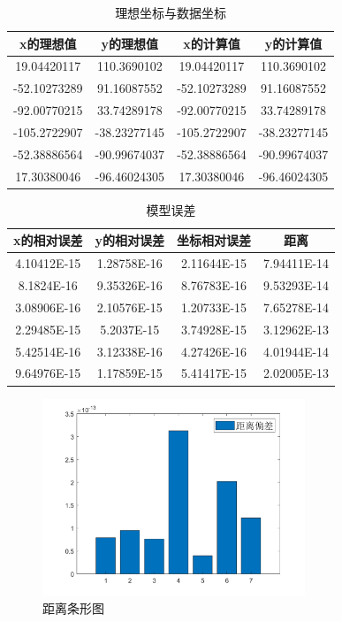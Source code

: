 \documentclass[12pt]{ctexart}
\begin{document}
\begin{spacing}{1.5}
\begin{center}
\begin{table}[H]
	\centering
	\begin{tabular}{cccc}
		\toprule[1.5pt]
		x的理想值        & y的理想值        & x的计算值        & y的计算值        \\ 
		\midrule[1pt]
		19.04420117  & 110.3690102  & 19.04420117  & 110.3690102  \\
		-52.10273289 & 91.16087552  & -52.10273289 & 91.16087552  \\
		-92.00770215 & 33.74289178  & -92.00770215 & 33.74289178  \\
		-105.2722907 & -38.23277145 & -105.2722907 & -38.23277145 \\
		-52.38886564 & -90.99674037 & -52.38886564 & -90.99674037 \\
		17.30380046  & -96.46024305 & 17.30380046  & -96.46024305 \\ 
		\bottomrule[1.5pt]
	\end{tabular}
	\caption{理想坐标与数据坐标}
	\label{b2}
\end{table}
\end{center}

\begin{center}
\begin{table}[H]
	\centering
	\begin{tabular}{cccc}
		\toprule[1.5pt]
		x的相对误差      & y的相对误差      & 坐标相对误差      & 距离          \\ 
		\midrule[1pt]
		4.10412E-15 & 1.28758E-16 & 2.11644E-15 & 7.94411E-14 \\
		8.1824E-16  & 9.35326E-16 & 8.76783E-16 & 9.53293E-14 \\
		3.08906E-16 & 2.10576E-15 & 1.20733E-15 & 7.65278E-14 \\
		2.29485E-15 & 5.2037E-15  & 3.74928E-15 & 3.12962E-13 \\
		5.42514E-16 & 3.12338E-16 & 4.27426E-16 & 4.01944E-14 \\
		9.64976E-15 & 1.17859E-15 & 5.41417E-15 & 2.02005E-13 \\ 
		\bottomrule[1.5pt]
	\end{tabular}
	\caption{模型误差}
	\label{b3}
\end{table}
\end{center}

\begin{figure}[H]
	\centering
	\includegraphics[width=0.7\textwidth]{dd.png}
	\caption{距离条形图}
	\label{tu4}
\end{figure}


\end{spacing}
\end{document}

